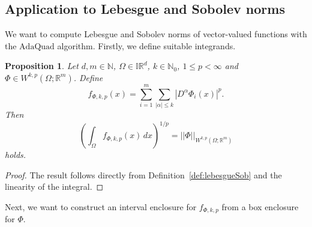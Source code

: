 \documentclass[a4paper, 11pt]{article}
\newtheorem{proposition}[theorem]{Proposition}
\begin{document}
	
	
	
	
	\subsection{Application to Lebesgue and Sobolev norms}
    
	We want to compute Lebesgue and Sobolev norms of vector-valued functions with the $\mathrm{AdaQuad}$ algorithm. Firstly, we define suitable integrands. 
	\begin{proposition}\label{prop: lebesgue sobolev integrand}
		Let $d,m\in \mathbb{N}$, $\Omega \in \mathbb{IR}^d$, $k\in \mathbb{N}_0$, $1\leq p < \infty$ and $\Phi \in W^{k,p}(\Omega;\mathbb{R}^m)$. Define
		\begin{equation}
			f_{\Phi,k,p}(x) = \sum_{i=1}^m\sum_{|\alpha| \leq k} |D^\alpha \Phi_i(x)|^p .
		\end{equation}
		Then
		\begin{equation}
			\left( \int_\Omega f_{\Phi,k,p}(x)\, dx\right)^{1/p} = ||\Phi||_{W^{k,p}(\Omega; \mathbb{R}^m)}
		\end{equation}
		holds.
	\end{proposition}
	\begin{proof}
		The result follows directly from Definition~\ref{def:lebesgueSob} and the linearity of the integral.
	\end{proof}
	
	Next, we want to construct an interval enclosure for $f_{\Phi,k,p}$ from a box enclosure for $\Phi$.
	
\end{document}
